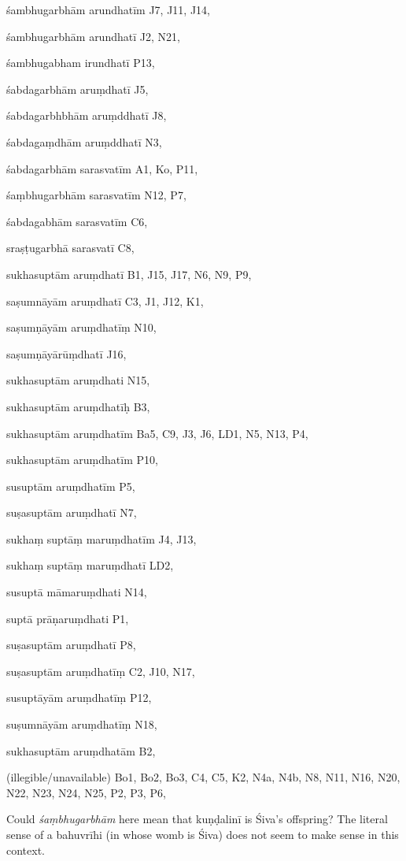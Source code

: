 \begin{marma}[hp03_119b]


\item[śambhugarbhām arundhatīm] J7, J11, J14, 
\item[śambhugarbhām arundhatī] J2, N21, 
\item[śambhugabham irundhatī] P13,
\item[śabdagarbhām aruṃdhatī] J5,
\item[śabdagarbhbhām aruṃddhatī] J8,
\item[śabdagaṃdhām aruṃddhatī] N3,
\item[śabdagarbhām sarasvatīm] A1, Ko, P11, 
\item[śaṃbhugarbhām sarasvatīm] N12, P7,
\item[śabdagabhām sarasvatīm] C6,
\item[sraṣṭugarbhā sarasvatī] C8,
\item[sukhasuptām aruṃdhatī] B1, J15, J17, N6, N9, P9, 
\item[saṣumnāyām aruṃdhatī] C3, J1, J12, K1, 
\item[saṣumṇāyām aruṃdhatīṃ] N10,
\item[saṣumṇāyārūṃdhatī] J16,
\item[sukhasuptām aruṃdhati] N15,
\item[sukhasuptām aruṃdhatīḥ] B3,
\item[sukhasuptām aruṃdhatīm] Ba5, C9, J3, J6, LD1, N5, N13, P4, 
\item[sukhasuptām aruṃdhatīm] P10,
\item[susuptām aruṃdhatīm] P5,
\item[suṣasuptām aruṃdhatī] N7,
\item[sukhaṃ suptāṃ maruṃdhatīm] J4, J13, 
\item[sukhaṃ suptāṃ maruṃdhatī] LD2,
\item[susuptā māmaruṃdhati] N14,
\item[suptā prāṇaruṃdhati] P1,
\item[suṣasuptām aruṃdhatī] P8,
\item[suṣasuptām aruṃdhatīṃ] C2, J10, N17,
\item[susuptāyām aruṃdhatīṃ] P12,
\item[suṣumnāyām aruṃdhatīṃ] N18,
\item[sukhasuptām aruṃdhatām] B2,
\item[(illegible/unavailable)] Bo1, Bo2, Bo3, C4, C5, K2, N4a, N4b, N8, N11, N16, N20, N22, N23, N24, N25, P2, P3, P6,

  \begin{description}
Could \emph{śaṃbhugarbhām} here mean that kuṇḍalinī is Śiva's offspring? The literal sense of a bahuvrīhi (in whose womb is Śiva) does not seem to make sense in this context.
  \end{description}

\end{marma}

